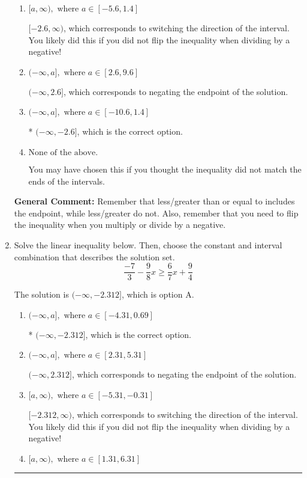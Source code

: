 \documentclass{extbook}[14pt]
\newcommand{\litem}[1]{\item #1

\rule{\textwidth}{0.4pt}}
\begin{document}
\begin{enumerate}
{\begin{enumerate}[label=\Alph*.]
 $[2.6, \infty)$, which corresponds to switching the direction of the interval AND negating the endpoint. You likely did this if you did not flip the inequality when dividing by a negative as well as not moving values over to a side properly.
\item \( [a, \infty), \text{ where } a \in [-5.6, 1.4] \)

 $[-2.6, \infty)$, which corresponds to switching the direction of the interval. You likely did this if you did not flip the inequality when dividing by a negative!
\item \( (-\infty, a], \text{ where } a \in [2.6, 9.6] \)

 $(-\infty, 2.6]$, which corresponds to negating the endpoint of the solution.
\item \( (-\infty, a], \text{ where } a \in [-10.6, 1.4] \)

* $(-\infty, -2.6]$, which is the correct option.
\item \( \text{None of the above}. \)

You may have chosen this if you thought the inequality did not match the ends of the intervals.
\end{enumerate}

\textbf{General Comment:} Remember that less/greater than or equal to includes the endpoint, while less/greater do not. Also, remember that you need to flip the inequality when you multiply or divide by a negative.
}
\litem{
Solve the linear inequality below. Then, choose the constant and interval combination that describes the solution set.
\[ \frac{-7}{3} - \frac{9}{8} x \geq \frac{6}{7} x + \frac{9}{4} \]

The solution is \( (-\infty, -2.312] \), which is option A.\begin{enumerate}[label=\Alph*.]
\item \( (-\infty, a], \text{ where } a \in [-4.31, 0.69] \)

* $(-\infty, -2.312]$, which is the correct option.
\item \( (-\infty, a], \text{ where } a \in [2.31, 5.31] \)

 $(-\infty, 2.312]$, which corresponds to negating the endpoint of the solution.
\item \( [a, \infty), \text{ where } a \in [-5.31, -0.31] \)

 $[-2.312, \infty)$, which corresponds to switching the direction of the interval. You likely did this if you did not flip the inequality when dividing by a negative!
\item \( [a, \infty), \text{ where } a \in [1.31, 6.31] \)


\end{enumerate}}
\end{enumerate}
\end{document}

